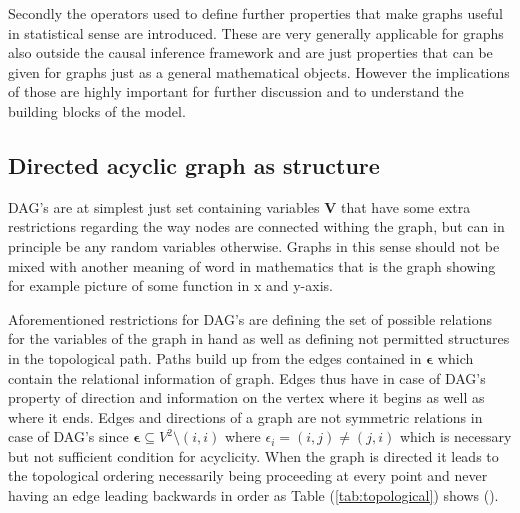 \documentclass[main=english,12pt,a4paper,pdftex,econ,utf8]{aaltothesis}
\newcommand{\e}{\bm{\epsilon}}
\newcommand{\vars}{\bm{V}}
\begin{document}
Secondly the operators used to define further properties that make graphs useful in statistical sense are introduced. These are very generally applicable for graphs also outside the causal inference framework and are just properties that can be given for graphs just as a general mathematical objects. However the implications of those are highly important for further discussion and to understand the building blocks of the model.

\subsection{Directed acyclic graph as structure}

DAG's are at simplest just set containing variables $\vars$ that have some extra restrictions regarding the way nodes are connected withing the graph, but can in principle be any random variables otherwise. Graphs in this sense should not be mixed with another meaning of word in mathematics that is the graph showing for example picture of some function in x and y-axis. 

Aforementioned restrictions for DAG's are defining the set of possible relations for the variables of the graph in hand as well as defining not permitted structures in the topological path. Paths build up from the edges contained in $\e$ which contain the relational information of graph. Edges thus have in case of DAG's property of direction and information on the vertex where it begins as well as where it ends. Edges and directions of a graph are not symmetric relations in case of DAG's since $\e\subseteq V^2\setminus(i,i)$ where $\epsilon_i=(i,j)\neq(j,i)$ which is necessary but not sufficient condition for acyclicity. When the graph is directed it leads to the topological ordering necessarily being proceeding at every point and never having an edge leading backwards in order as Table (\ref{tab:topological}) shows (\cite{Peters2017}).


\end{document}
